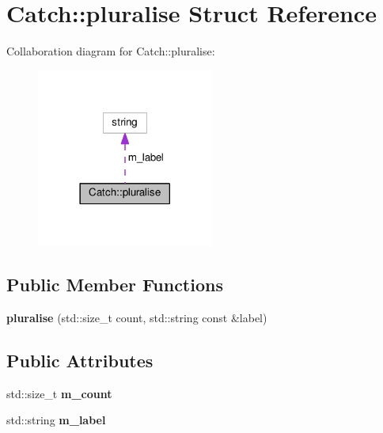 \hypertarget{structCatch_1_1pluralise}{}\section{Catch\+:\+:pluralise Struct Reference}
\label{structCatch_1_1pluralise}


Collaboration diagram for Catch\+:\+:pluralise\+:
\nopagebreak
\begin{figure}[H]
\begin{center}
\leavevmode
\includegraphics[width=165pt]{structCatch_1_1pluralise__coll__graph}
\end{center}
\end{figure}
\subsection*{Public Member Functions}
\begin{DoxyCompactItemize}
\item 
{\bfseries pluralise} (std\+::size\+\_\+t count, std\+::string const \&label)\hypertarget{structCatch_1_1pluralise_a5c55e22de2416cfe416edf715c6b9234}{}\label{structCatch_1_1pluralise_a5c55e22de2416cfe416edf715c6b9234}

\end{DoxyCompactItemize}
\subsection*{Public Attributes}
\begin{DoxyCompactItemize}
\item 
std\+::size\+\_\+t {\bfseries m\+\_\+count}\hypertarget{structCatch_1_1pluralise_a4dce2fa13ec6f00fac09b2418265441e}{}\label{structCatch_1_1pluralise_a4dce2fa13ec6f00fac09b2418265441e}

\item 
std\+::string {\bfseries m\+\_\+label}\hypertarget{structCatch_1_1pluralise_a8849cbdd3f11ebe7747597c8644e8793}{}\label{structCatch_1_1pluralise_a8849cbdd3f11ebe7747597c8644e8793}

\end{DoxyCompactItemize}
